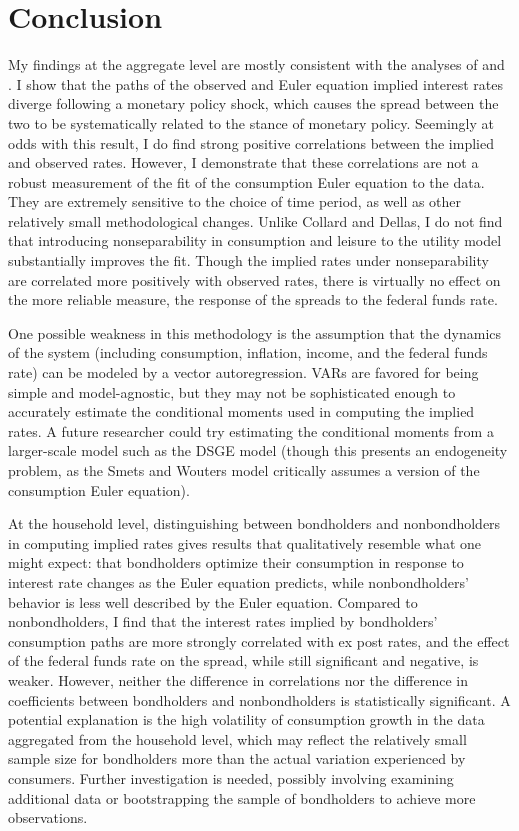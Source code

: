 \section{Conclusion}
My findings at the aggregate level are mostly consistent with the analyses of \cite{canzoneri07} and \cite{collard11}. I show that the paths of the observed and Euler equation implied interest rates diverge following a monetary policy shock, which causes the spread between the two to be systematically related to the stance of monetary policy. Seemingly at odds with this result, I do find strong positive correlations between the implied and observed rates. However, I demonstrate that these correlations are not a robust measurement of the fit of the consumption Euler equation to the data. They are extremely sensitive to the choice of time period, as well as other relatively small methodological changes. Unlike Collard and Dellas, I do not find that introducing nonseparability in consumption and leisure to the utility model substantially improves the fit. Though the implied rates under nonseparability are correlated more positively with observed rates, there is virtually no effect on the more reliable measure, the response of the spreads to the federal funds rate.

One possible weakness in this methodology is the assumption that the dynamics of the system (including consumption, inflation, income, and the federal funds rate) can be modeled by a vector autoregression. VARs are favored for being simple and model-agnostic, but they may not be sophisticated enough to accurately estimate the conditional moments used in computing the implied rates. A future researcher could try estimating the conditional moments from a larger-scale model such as the \cite{smets07} DSGE model (though this presents an endogeneity problem, as the Smets and Wouters model critically assumes a version of the consumption Euler equation).

At the household level, distinguishing between bondholders and nonbondholders in computing implied rates gives results that qualitatively resemble what one might expect: that bondholders optimize their consumption in response to interest rate changes as the Euler equation predicts, while nonbondholders' behavior is less well described by the Euler equation. Compared to nonbondholders, I find that the interest rates implied by bondholders' consumption paths are more strongly correlated with ex post rates, and the effect of the federal funds rate on the spread, while still significant and negative, is weaker. However, neither the difference in correlations nor the difference in coefficients between bondholders and nonbondholders is statistically significant. A potential explanation is the high volatility of consumption growth in the data aggregated from the household level, which may reflect the relatively small sample size for bondholders more than the actual variation experienced by consumers. Further investigation is needed, possibly involving examining additional data or bootstrapping the sample of bondholders to achieve more observations.

